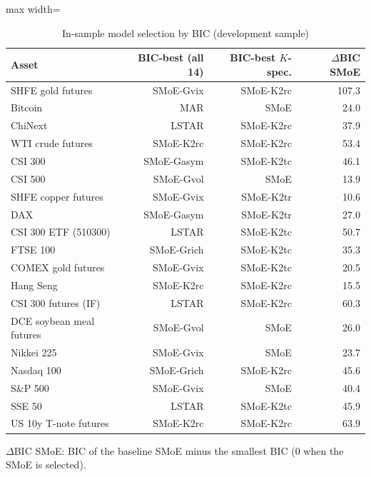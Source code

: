 \begin{table}[!htbp]\centering\footnotesize
\caption{In-sample model selection by BIC (development sample)}\label{tab:kg-bic}
\begin{adjustbox}{max width=\textwidth}
\begin{tabular}{lrrr}
\toprule
Asset & BIC-best (all 14) & BIC-best $K$-spec. & $\Delta$BIC SMoE\\
\midrule
SHFE gold futures & SMoE-Gvix & SMoE-K2rc & 107.3\\
Bitcoin & MAR & SMoE & 24.0\\
ChiNext & LSTAR & SMoE-K2rc & 37.9\\
WTI crude futures & SMoE-K2rc & SMoE-K2rc & 53.4\\
CSI 300 & SMoE-Gasym & SMoE-K2tc & 46.1\\
CSI 500 & SMoE-Gvol & SMoE & 13.9\\
SHFE copper futures & SMoE-Gvix & SMoE-K2tr & 10.6\\
DAX & SMoE-Gasym & SMoE-K2tr & 27.0\\
CSI 300 ETF (510300) & LSTAR & SMoE-K2tc & 50.7\\
FTSE 100 & SMoE-Grich & SMoE-K2tc & 35.3\\
COMEX gold futures & SMoE-Gvix & SMoE-K2tc & 20.5\\
Hang Seng & SMoE-K2rc & SMoE-K2rc & 15.5\\
CSI 300 futures (IF) & LSTAR & SMoE-K2rc & 60.3\\
DCE soybean meal futures & SMoE-Gvol & SMoE & 26.0\\
Nikkei 225 & SMoE-Gvix & SMoE & 23.7\\
Nasdaq 100 & SMoE-Grich & SMoE-K2rc & 45.6\\
S\&P 500 & SMoE-Gvix & SMoE & 40.4\\
SSE 50 & LSTAR & SMoE-K2tc & 45.9\\
US 10y T-note futures & SMoE-K2rc & SMoE-K2rc & 63.9\\
\bottomrule
\end{tabular}
\end{adjustbox}
\par\smallskip\begin{minipage}{\textwidth}\footnotesize
$\Delta$BIC SMoE: BIC of the baseline SMoE minus the smallest BIC (0 when the SMoE is selected).
\end{minipage}
\end{table}